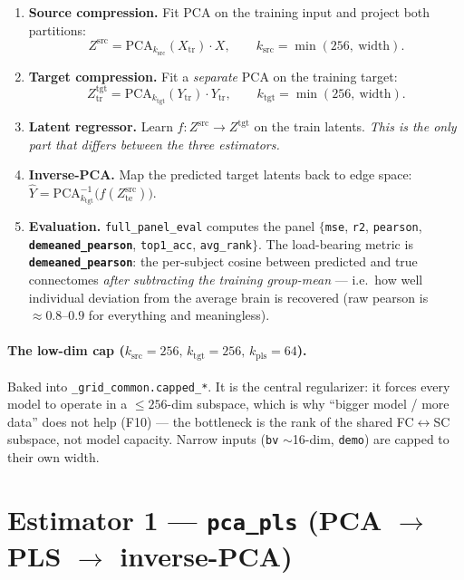 \documentclass[11pt]{article}
\newcommand{\code}[1]{\texttt{#1}}
\newcommand{\Xtr}{X_{\mathrm{tr}}}
\newcommand{\Ytr}{Y_{\mathrm{tr}}}
\begin{document}
\begin{enumerate}[leftmargin=2.2em,label=\textbf{P\arabic*.}]
\item \textbf{Source compression.}
  Fit $\mathrm{PCA}$ on the training input and project both partitions:
  \[
    Z^{\mathrm{src}} = \mathrm{PCA}_{k_{\mathrm{src}}}(\Xtr)\!\cdot\!X,
    \qquad k_{\mathrm{src}} = \min(256,\ \text{width}).
  \]
\item \textbf{Target compression.}
  Fit a \emph{separate} $\mathrm{PCA}$ on the training target:
  \[
    Z^{\mathrm{tgt}}_{\mathrm{tr}} = \mathrm{PCA}_{k_{\mathrm{tgt}}}(\Ytr)\!\cdot\!\Ytr,
    \qquad k_{\mathrm{tgt}} = \min(256,\ \text{width}).
  \]
\item \textbf{Latent regressor.}
  Learn $f: Z^{\mathrm{src}} \to Z^{\mathrm{tgt}}$ on the train latents.
  \emph{This is the only part that differs between the three estimators.}
\item \textbf{Inverse-PCA.}
  Map the predicted target latents back to edge space:
  $\hat Y = \mathrm{PCA}_{k_{\mathrm{tgt}}}^{-1}\big(f(Z^{\mathrm{src}}_{\mathrm{te}})\big).$
\item \textbf{Evaluation.} \code{full\_panel\_eval} computes the panel
  $\{$\code{mse}, \code{r2}, \code{pearson}, \textbf{\code{demeaned\_pearson}}, \code{top1\_acc},
  \code{avg\_rank}$\}$. The load-bearing metric is \textbf{\code{demeaned\_pearson}}: the
  per-subject cosine between predicted and true connectomes \emph{after subtracting the training
  group-mean} --- i.e.\ how well individual deviation from the average brain is recovered (raw
  pearson is $\approx0.8$--$0.9$ for everything and meaningless).
\end{enumerate}

\paragraph{The low-dim cap ($k_{\mathrm{src}}\!=\!256,\,k_{\mathrm{tgt}}\!=\!256,\,k_{\mathrm{pls}}\!=\!64$).}
Baked into \code{\_grid\_common.capped\_*}. It is the central regularizer: it forces every model
to operate in a $\le256$-dim subspace, which is why ``bigger model / more data'' does not help
(F10) --- the bottleneck is the rank of the shared FC$\leftrightarrow$SC subspace, not model
capacity. Narrow inputs (\code{bv} $\sim$16-dim, \code{demo}) are capped to their own width.

\section{Estimator 1 --- \code{pca\_pls} (PCA $\to$ PLS $\to$ inverse-PCA)}\label{sec:pls}
\end{document}
